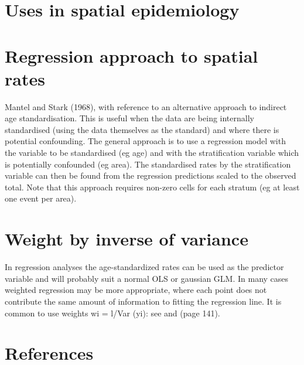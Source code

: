 \documentclass[a4paper]{article}
\begin{document}
\section{Uses in spatial epidemiology}
\label{sec-12}
\section{Regression approach to spatial rates}
\label{sec-13}

Mantel and Stark (1968), with reference to an alternative approach to indirect age standardisation. This is useful when the data are being internally standardised (using the data themselves as the standard) 
and where there is potential confounding. The general approach is to use a regression model with the variable to be standardised (eg age) and with the stratification variable which is potentially confounded (eg area). 
The standardised rates by the stratification variable can then be found from the regression predictions scaled to the observed total. Note that this approach requires non-zero cells for each stratum (eg at least one event per area).
\section{Weight by inverse of variance}
\label{sec-14}

In regression analyses the age-standardized rates can be used as the predictor variable and will probably suit a normal OLS or gaussian GLM.  In many cases weighted regression may be more appropriate, where each point does not contribute the same amount of information to fitting the regression line. It is common to use weights wi = l/Var (yi): see \cite{Armitage} and
\cite{Boyle} (page 141).
\section{References}
\label{sec-15}



\end{document}
